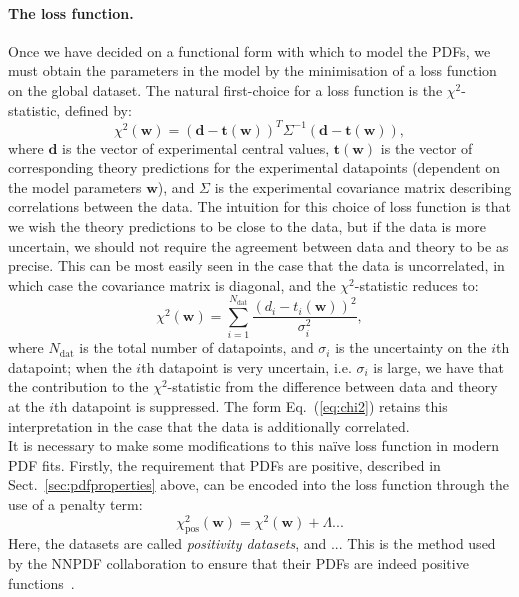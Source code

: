 \documentclass[withindex,glossary]{cam-thesis}
\renewcommand{\vec}[1]{\textbf{#1}} %
\begin{document}
\paragraph{The loss function.} Once we have decided on a functional form with which to model the PDFs, we must obtain the parameters in the model by the minimisation of a loss function on the global dataset. The natural first-choice for a loss function is the $\chi^2$-statistic, defined by:
\begin{equation}
\label{eq:chi2}
\chi^2(\vec{w}) = (\vec{d} - \vec{t}(\vec{w}))^T \Sigma^{-1} (\vec{d} - \vec{t}(\vec{w})),
\end{equation}
where $\vec{d}$ is the vector of experimental central values, $\vec{t}(\vec{w})$ is the vector of corresponding theory predictions for the experimental datapoints (dependent on the model parameters $\vec{w}$), and $\Sigma$ is the experimental covariance matrix describing correlations between the data. The intuition for this choice of loss function is that we wish the theory predictions to be close to the data, but if the data is more uncertain, we should not require the agreement between data and theory to be as precise. This can be most easily seen in the case that the data is uncorrelated, in which case the covariance matrix is diagonal, and the $\chi^2$-statistic reduces to:
\begin{equation}
\label{eq:chi2_uncorrelated}
\chi^2(\vec{w}) = \sum_{i=1}^{N_{\text{dat}}} \frac{(d_i - t_i(\vec{w}))^2}{\sigma_i^2},
\end{equation}
where $N_{\text{dat}}$ is the total number of datapoints, and $\sigma_i$ is the uncertainty on the $i$th datapoint; when the $i$th datapoint is very uncertain, i.e. $\sigma_i$ is large, we have that the contribution to the $\chi^2$-statistic from the difference between data and theory at the $i$th datapoint is suppressed. The form Eq.~(\ref{eq:chi2}) retains this interpretation in the case that the data is additionally correlated.\\

\noindent It is necessary to make some modifications to this na\"{i}ve loss function in modern PDF fits. Firstly, the requirement that PDFs are positive, described in Sect.~\ref{sec:pdfproperties} above, can be encoded into the loss function through the use of a penalty term:
\begin{equation}
\chi^2_{\text{pos}}(\vec{w}) = \chi^2(\vec{w}) + \Lambda ... 
\end{equation}
Here, the datasets are called \textit{positivity datasets}, and ... This is the method used by the NNPDF collaboration to ensure that their PDFs are indeed positive functions~\cite{NNPDF:2021njg}.
\end{document}
